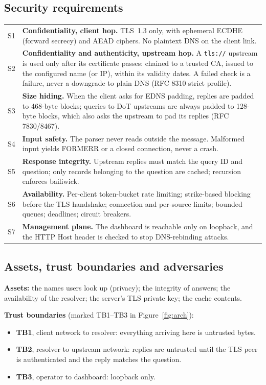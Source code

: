 \documentclass[11pt,a4paper]{article}
\newcommand{\code}[1]{\texttt{#1}}
\begin{document}
\subsection{Security requirements}
\begin{tabularx}{\textwidth}{@{}lL@{}}
\toprule
S1 & \textbf{Confidentiality, client hop.} TLS~1.3 only, with ephemeral ECDHE (forward secrecy) and AEAD ciphers. No plaintext DNS on the client link. \\
S2 & \textbf{Confidentiality and authenticity, upstream hop.} A \code{tls://} upstream is used only after its certificate passes: chained to a trusted CA, issued to the configured name (or IP), within its validity dates. A failed check is a failure, never a downgrade to plain DNS (RFC 8310 strict profile). \\
S3 & \textbf{Size hiding.} When the client asks for EDNS padding, replies are padded to 468-byte blocks; queries to DoT upstreams are always padded to 128-byte blocks, which also asks the upstream to pad its replies (RFC 7830/8467). \\
S4 & \textbf{Input safety.} The parser never reads outside the message. Malformed input yields FORMERR or a closed connection, never a crash. \\
S5 & \textbf{Response integrity.} Upstream replies must match the query ID and question; only records belonging to the question are cached; recursion enforces bailiwick. \\
S6 & \textbf{Availability.} Per-client token-bucket rate limiting; strike-based blocking before the TLS handshake; connection and per-source limits; bounded queues; deadlines; circuit breakers. \\
S7 & \textbf{Management plane.} The dashboard is reachable only on loopback, and the HTTP Host header is checked to stop DNS-rebinding attacks. \\
\bottomrule
\end{tabularx}

\subsection{Assets, trust boundaries and adversaries}
\textbf{Assets:} the names users look up (privacy); the integrity of answers; the availability of the
resolver; the server's TLS private key; the cache contents.

\textbf{Trust boundaries} (marked TB1--TB3 in Figure~\ref{fig:arch}):
\begin{itemize}
  \item \textbf{TB1}, client network to resolver: everything arriving here is untrusted bytes.
  \item \textbf{TB2}, resolver to upstream network: replies are untrusted until the TLS peer is authenticated and
  the reply matches the question.
  \item \textbf{TB3}, operator to dashboard: loopback only.
\end{itemize}
\end{document}
